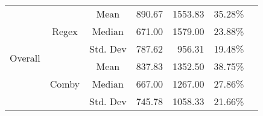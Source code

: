 \documentclass[sigconf,review, anonymous]{acmart}
\begin{document}
{\begin{table}[hbtp]
{\begin{tabular}{|c|c|c|r|r|r|c|}
\multirow{6}{*}{Overall} & \multirow{3}{*}{Regex} & Mean & 890.67 &	1553.83 & 35.28\% & \\\cline{3-6}
    &   &  Median & 671.00 & 1579.00 & 23.88\%  & \\\cline{3-6}
    &   &  Std. Dev & 787.62 & 956.31 & 19.48\% & \\\cline{2-6}

 & \multirow{3}{*}{Comby} & Mean & 837.83 & 1352.50 & 38.75\% & \\\cline{3-6}
    &   &  Median & 667.00 & 1267.00 & 27.86\% & \\\cline{3-6}
    &   &  Std. Dev & 745.78 & 1058.33	& 21.66\% & \\\hline

\end{tabular}
}

\end{table}

  

\begin{table}[hbtp]
\centering
\caption{Java (Regex vs. Comby)}
\label{tab:table_java1}
\end{table}}
\end{document}
